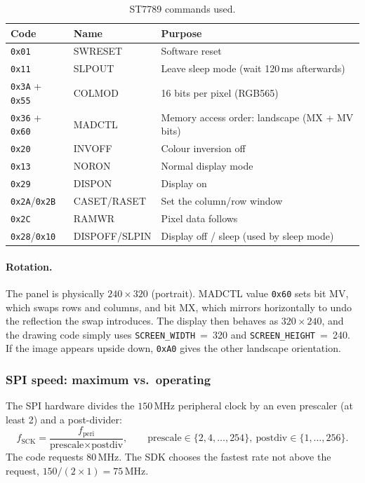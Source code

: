 \documentclass[11pt,a4paper]{article}
\newcommand{\unit}[2]{\ensuremath{#1\,\mathrm{#2}}}
\begin{document}
\begin{table}[H]
\centering
\caption{ST7789 commands used.}\label{tab:cmds}
\begin{tabular}{lll}
\toprule
\textbf{Code} & \textbf{Name} & \textbf{Purpose} \\
\midrule
\texttt{0x01} & SWRESET & Software reset \\
\texttt{0x11} & SLPOUT & Leave sleep mode (wait 120\,ms afterwards) \\
\texttt{0x3A} + \texttt{0x55} & COLMOD & 16 bits per pixel (RGB565) \\
\texttt{0x36} + \texttt{0x60} & MADCTL & Memory access order: landscape (MX + MV bits) \\
\texttt{0x20} & INVOFF & Colour inversion off \\
\texttt{0x13} & NORON & Normal display mode \\
\texttt{0x29} & DISPON & Display on \\
\texttt{0x2A}/\texttt{0x2B} & CASET/RASET & Set the column/row window \\
\texttt{0x2C} & RAMWR & Pixel data follows \\
\texttt{0x28}/\texttt{0x10} & DISPOFF/SLPIN & Display off / sleep (used by sleep mode) \\
\bottomrule
\end{tabular}
\end{table}

\paragraph{Rotation.} The panel is physically $240\times320$ (portrait). MADCTL
value \texttt{0x60} sets bit MV, which swaps rows and columns, and bit MX, which
mirrors horizontally to undo the reflection the swap introduces. The display
then behaves as $320\times240$, and the drawing code simply uses
\texttt{SCREEN\_WIDTH}~=~320 and \texttt{SCREEN\_HEIGHT}~=~240. If the image
appears upside down, \texttt{0xA0} gives the other landscape orientation.

\subsubsection{SPI speed: maximum vs.\ operating}\label{sec:spispeed}
The SPI hardware divides the \unit{150}{MHz} peripheral clock by an even
prescaler (at least 2) and a post-divider:
\[
  f_{\text{SCK}} = \frac{f_{\text{peri}}}{\text{prescale}\times\text{postdiv}},
  \qquad \text{prescale} \in \{2,4,\dots,254\},\ \text{postdiv}\in\{1,\dots,256\}.
\]
The code requests \unit{80}{MHz}. The SDK chooses the fastest rate not above the
request, $150/(2\times1) = \unit{75}{MHz}$.
\end{document}
